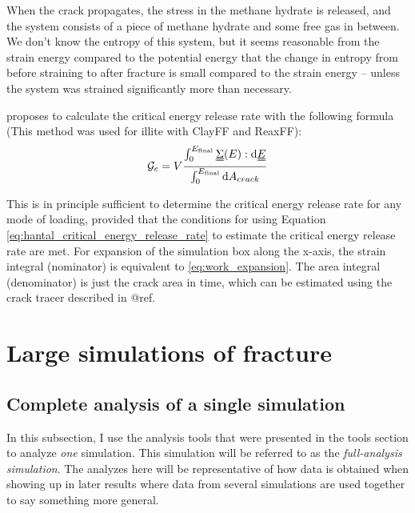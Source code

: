 When the crack propagates, the stress in the methane hydrate is released, and the system consists of a piece of methane hydrate and some free gas in between. We don't know the entropy of this system, but it seems reasonable from the strain energy compared to the potential energy that the change in entropy from before straining to after fracture is small compared to the strain energy -- unless the system was strained significantly more than necessary.


\citet{Hantal2014} proposes to calculate the critical energy release rate with the following formula (This method was used for illite with ClayFF and ReaxFF):
\begin{equation}
	\mathcal{G}_c = V \frac{\int_0^{E_{\text{final}}}\uuline{\Sigma}(E) : \dd \uuline{E}}{\int_0^{E_{\text{final}}} \dd A_{crack}}
	\label{eq:hantal_critical_energy_release_rate}
\end{equation}


This is in principle sufficient to determine the critical energy release rate for any mode of loading, provided that the conditions for using Equation \ref{eq:hantal_critical_energy_release_rate} to estimate the critical energy release rate are met. 
For expansion of the simulation box along the x-axis, the strain integral (nominator) is equivalent to \ref{eq:work_expansion}. The area integral (denominator) is just the crack area in time, which can be estimated using the crack tracer described in @ref. 

\section{Large simulations of fracture}

\subsection{Complete analysis of a single simulation}
\label{sec:complete_analysis_single_simulation}
In this subsection, I use the analysis tools that were presented in the tools section to analyze \emph{one} simulation. This simulation will be referred to as the \emph{full-analysis simulation}. The analyzes here will be representative of how data is obtained when showing up in later results where data from several simulations are used together to say something more general.

